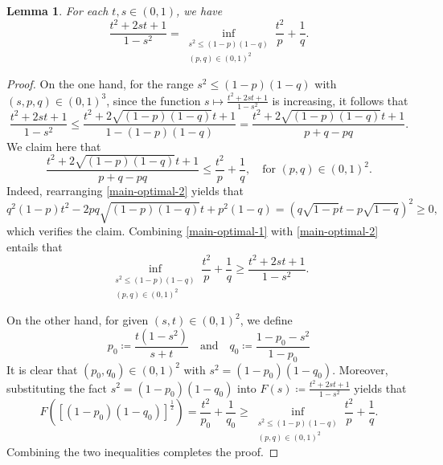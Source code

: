 \documentclass{amsbook}
\newtheorem{lemma}[theorem]{Lemma}
\theoremstyle{definition}
\theoremstyle{remark}
\numberwithin{section}{chapter}
\numberwithin{equation}{chapter}
\newcommand{\1}{\mathbf{1}}
\begin{document}
\begin{lemma}\label{optimal}
	For each $t,s\in (0,1)$, we have
	\[
\frac{t^{2}+2st+1}{1-s^{2}}=	\inf_{\substack{s^{2}\leq (1-p)(1-q)\\(p,q)\in(0,1)^{2}}}\frac{t^{2}}{p}+\frac{1}{q}.
	\]
\end{lemma}
\begin{proof}
	On the one hand, for the range $s^{2}\leq (1-p)(1-q)$ with $(s,p,q)\in(0,1)^{3}$, since the function $s\mapsto \frac{t^{2}+2st+1}{1-s^{2}}$ is increasing, it follows that 
	\begin{equation}\label{main-optimal-1}
		\frac{t^{2}+2st+1}{1-s^{2}}\leq \frac{t^{2}+2\sqrt{(1-p)(1-q)}t+1}{1-(1-p)(1-q)}=\frac{t^{2}+2\sqrt{(1-p)(1-q)}t+1}{p+q-pq}.
	\end{equation}
	We claim here that
	\begin{equation}\label{main-optimal-2}
		\frac{t^{2}+2\sqrt{(1-p)(1-q)}t+1}{p+q-pq}\leq \frac{t^{2}}{p}+\frac{1}{q},\quad\mbox{for }(p,q)\in(0,1)^{2}.
	\end{equation}
Indeed,	rearranging \eqref{main-optimal-2} yields that
	\[
	q^{2}(1-p)t^{2}-2pq\sqrt{(1-p)(1-q)}t+p^{2}(1-q)=\left(q\sqrt{1-p}t-p\sqrt{1-q}\right)^{2}\geq 0,
	\]
	which verifies the claim. Combining \eqref{main-optimal-1} with \eqref{main-optimal-2} entails that
	\[
	\inf_{\substack{s^{2}\leq (1-p)(1-q)\\(p,q)\in(0,1)^{2}}}\frac{t^{2}}{p}+\frac{1}{q}\geq \frac{t^{2}+2st+1}{1-s^{2}}.
	\]
	
	On the other hand, for given $(s,t)\in (0,1)^{2}$, we define
	\[
	p_{0}\coloneqq \frac{t(1-s^{2})}{s+t}\quad\mbox{and}\quad q_{0}\coloneqq \frac{1-p_{0}-s^{2}}{1-p_{0}}
	\]
	It is clear that $(p_{0},q_{0})\in (0,1)^{2}$ with $s^{2}=(1-p_{0})(1-q_{0})$. Moreover, substituting the fact $s^{2}=(1-p_{0})(1-q_{0})$ into $F(s)\coloneqq\frac{t^{2}+2st+1}{1-s^{2}}$ yields that
	\[
	F([(1-p_{0})(1-q_{0})]^{\frac{1}{2}})=\frac{t^{2}}{p_{0}}+\frac{1}{q_{0}}\geq \inf_{\substack{s^{2}\leq (1-p)(1-q)\\(p,q)\in(0,1)^2}}\frac{t^{2}}{p}+\frac{1}{q}.
	\]
	Combining the two inequalities completes the proof.
\end{proof}
\end{document}
